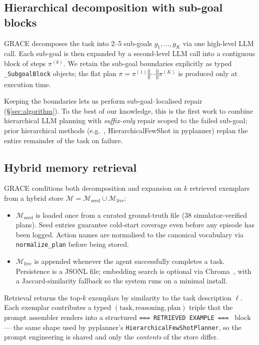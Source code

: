 \subsection{Hierarchical decomposition with sub-goal blocks}\label{sec:hierarchy}

GRACE decomposes the task into 2--5 sub-goals
$g_1, \dots, g_K$ via one high-level LLM call. Each sub-goal is then
expanded by a second-level LLM call into a contiguous block of
steps $\pi^{(k)}$. We retain the sub-goal boundaries explicitly as
typed \texttt{\_SubgoalBlock} objects; the flat plan
$\pi = \pi^{(1)} \mathbin{\Vert} \cdots \mathbin{\Vert} \pi^{(K)}$ is
produced only at execution time.

Keeping the boundaries lets us perform sub-goal--localised repair
(\S\ref{sec:algorithm}). To the best of our knowledge, this is the
first work to combine hierarchical LLM planning with
\emph{suffix-only} repair scoped to the failed sub-goal; prior
hierarchical methods (e.g.~\cite{ajay2023hip},
HierarchicalFewShot in pyplanner) replan the entire remainder of the
task on failure.

\subsection{Hybrid memory retrieval}\label{sec:memory}

GRACE conditions both decomposition and expansion on $k$ retrieved
exemplars from a hybrid store $\mathcal{M} = \mathcal{M}_{\text{seed}}
\cup \mathcal{M}_{\text{live}}$:

\begin{itemize}
  \item $\mathcal{M}_{\text{seed}}$ is loaded once from a curated
    ground-truth file (38 simulator-verified plans). Seed entries
    guarantee cold-start coverage even before any episode has been
    logged. Action names are normalised to the canonical vocabulary
    via \texttt{normalize\_plan} before being stored.
  \item $\mathcal{M}_{\text{live}}$ is appended whenever the agent
    successfully completes a task. Persistence is a JSONL file;
    embedding search is optional via Chroma~\cite{chroma}, with a
    Jaccard-similarity fallback so the system runs on a minimal
    install.
\end{itemize}

Retrieval returns the top-$k$ exemplars by similarity to the task
description $\ell$. Each exemplar contributes a typed
$(\mathrm{task}, \mathrm{reasoning}, \mathrm{plan})$ triple
that the prompt assembler renders into a structured
\texttt{=== RETRIEVED EXAMPLE === } block — the same shape used by
pyplanner's \texttt{HierarchicalFewShotPlanner}, so the prompt
engineering is shared and only the \emph{contents} of the store
differ.

